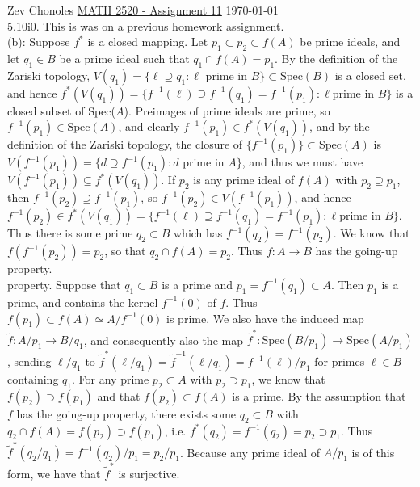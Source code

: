\documentclass[11pt]{article}
\begin{document}
Zev Chonoles \hfill 
\underline{MATH 2520 - Assignment 11} \hfill \today\\

\num{5.10i.} This is was on a previous homework assignment.\\%
(b): Suppose $f^*$ is a closed mapping. Let $p_1\subset p_2\subset f(A)$
be prime ideals, and let $q_1\in B$ be a prime ideal such that $q_1\cap
f(A)=p_1$. By the definition of the Zariski topology, $V(q_1)=\{\ell\supseteq
q_1:\ell\text{ prime in }B\}\subset\text{Spec}(B)$ is a closed set, and hence
$f^*(V(q_1))=\{f^{-1}(\ell)\supseteq f^{-1}(q_1)=f^{-1}(p_1):\ell\text{
prime in }B\}$ is a closed subset of Spec($A$). Preimages of prime
ideals are prime, so $f^{-1}(p_1)\in\text{Spec}(A)$, and clearly
$f^{-1}(p_1)\in f^*(V(q_1))$, and by the definition of the Zariski
topology, the closure of $\{f^{-1}(p_1)\}\subset\text{Spec}(A)$ is
$V(f^{-1}(p_1))=\{d\supseteq f^{-1}(p_1):d\text{ prime in }A\}$, and
thus we must have $V(f^{-1}(p_1))\subseteq f^*(V(q_1))$. If $p_2$ is any
prime ideal of $f(A)$ with $p_2\supseteq p_1$, then $f^{-1}(p_2)\supseteq
f^{-1}(p_1)$, so $f^{-1}(p_2)\in  V(f^{-1}(p_1))$, and hence $f^{-1}(p_2)\in
f^*(V(q_1))=\{f^{-1}(\ell)\supseteq f^{-1}(q_1)=f^{-1}(p_1):\ell\text{
prime in }B\}$. Thus there is some prime $q_2\subset B$ which has
$f^{-1}(q_2)=f^{-1}(p_2)$. We know that $f(f^{-1}(p_2))=p_2$, so that $q_2\cap
f(A)=p_2$. Thus $f:A\rightarrow B$ has the going-up property.\\

property. Suppose that $q_1\subset B$ is a prime and $p_1=f^{-1}(q_1)\subset
A$. Then $p_1$ is a prime, and contains the kernel $f^{-1}(0)$ of $f$. Thus
$f(p_1)\subset f(A)\simeq A/f^{-1}(0)$ is prime. We also have the induced
map $\tilde{f}:A/p_1\rightarrow B/q_1$, and consequently also the map
$\tilde{f}^*:\text{Spec}(B/p_1)\rightarrow\text{Spec}(A/p_1)$, sending
$\ell/q_1$ to $\tilde{f}^*(\ell/q_1)=\tilde{f}^{-1}(\ell/q_1)=f^{-1}(\ell)/p_1$
for primes $\ell\in B$ containing $q_1$. For any prime $p_2\subset
A$ with $p_2\supset p_1$, we know that $f(p_2)\supset f(p_1)$ and
that $f(p_2)\subset f(A)$ is a prime. By the assumption that $f$ has
the going-up property, there exists some $q_2\subset B$ with $q_2\cap
f(A)=f(p_2)\supset f(p_1)$, i.e. $f^*(q_2)=f^{-1}(q_2)=p_2\supset p_1$. Thus
$\tilde{f}^*(q_2/q_1)=f^{-1}(q_2)/p_1=p_2/p_1$. Because any prime ideal of
$A/p_1$ is of this form, we have that $\tilde{f}^*$ is surjective.\\    
\end{document}
